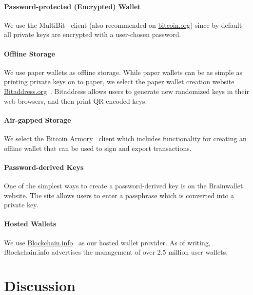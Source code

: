\paragraph{Password-protected (Encrypted) Wallet} We use the MultiBit~\cite{multibit} client (also recommended on \url{bitcoin.org}) since by default all private keys are encrypted with a user-chosen password. 

\paragraph{Offline Storage} We use paper wallets as offline storage. While paper wallets can be as simple as printing private keys on to paper, we select the paper wallet creation website \url{Bitaddress.org}~\cite{bitaddress}. Bitaddress allows users to generate new randomized keys in their web browsers, and then print QR encoded keys. 

\paragraph{Air-gapped Storage} We select the Bitcoin Armory~\cite{bitcoinarmory} client which includes functionality for creating an offline wallet that can be used to sign and export transactions. 

\paragraph{Password-derived Keys} One of the simplest ways to create a password-derived key is on the Brainwallet~\cite{brainwallet} website. The site allows users to enter a passphrase which is converted into a private key. 

\paragraph{Hosted Wallets} We use \url{Blockchain.info}~\cite{blockchain} as our hosted wallet provider. As of writing, Blockchain.info advertises the management of over 2.5 million user wallets.



%


\section{Discussion}

